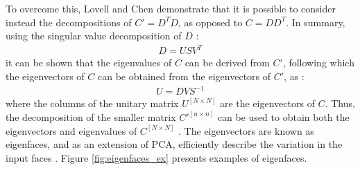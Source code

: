 To overcome this, Lovell and Chen \cite{lovell_2008} demonstrate that it is possible to consider instead the decompositions of $C'=D^TD$, as opposed to $C=DD^T$. In summary, using the singular value decomposition of $D$ \cite{lovell_2008}:
\begin{align}
  D = USV^T
\end{align}
it can be shown that the eigenvalues of $C$ can be derived from $C'$, following which the eigenvectors of $C$ can be obtained from the eigenvectors of $C'$, as \cite{lovell_2008}:
\begin{align}
  U = DVS^{-1}
\end{align}
where the columns of the unitary matrix $U^{[N\times N]}$ are the eigenvectors of $C$. Thus, the decomposition of the smaller matrix $C'^{[n\times n]}$ can be used to obtain both the eigenvectors and eigenvalues of $C^{[N\times N]}$ \cite{lovell_2008}. The eigenvectors are known as eigenfaces, and as an extension of PCA, efficiently describe the variation in the input faces \cite{lovell_2008}. Figure \ref{fig:eigenfaces_ex} presents examples of eigenfaces.

